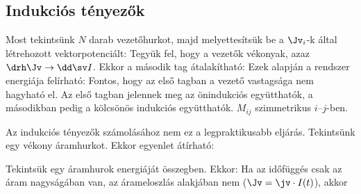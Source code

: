   \subsection{Indukciós tényezők}\label{ss:12-indegyh}
   
   Most tekintsünk $N$ darab vezetőhurkot, majd melyettesítsük be a $\Jv_i$-k által létrehozott vektorpotenciált:
   Tegyük fel, hogy a vezetők vékonyak, azaz $\drh \Jv\to\dd \sv I$.
   Ekkor a második tag átalakítható:
   Ezek alapján a rendszer energiája felírható:
   Fontos, hogy az első tagban a vezető vastagsága nem hagyható el.
   Az első tagban jelennek meg az önindukciós együtthatók, a másodikban pedig a kölcsönös indukciós együtthatók. $M_{ij}$ szimmetrikus $i$--$j$-ben.
   
   Az indukciós tényezők számolásához nem ez a legpraktikusabb eljárás.
   Tekintsünk egy vékony áramhurkot.
   Ekkor  egyenlet átírható:
   
   Tekintsük egy áramhurok energiáját  összegben.
   Ekkor:
   Ha az időfüggés csak az áram nagyságában van, az árameloszlás alakjában nem ($\Jv=\jv\cdot I(t)$), akkor
   
